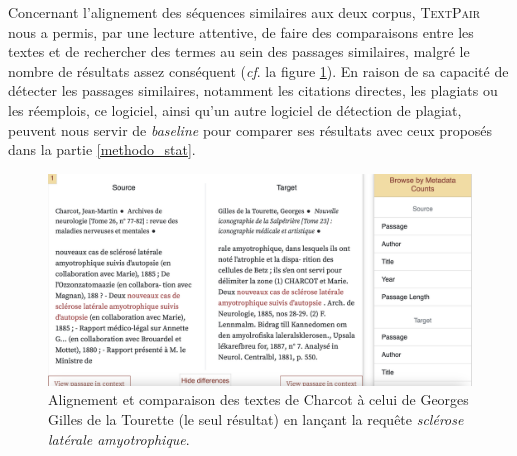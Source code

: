 Concernant l'alignement des séquences similaires aux deux corpus, \textsc{TextPair} nous a permis, par une lecture attentive, de faire des comparaisons entre les textes et de rechercher des termes au sein des passages similaires, malgré le nombre de résultats assez conséquent (\textit{cf}. la figure \ref{fig:textpair}). En raison de sa capacité de détecter les passages similaires, notamment les citations directes, les plagiats ou les réemplois, ce logiciel, ainsi qu'un autre logiciel de détection de plagiat, peuvent nous servir de \textit{baseline} pour comparer ses résultats avec ceux proposés dans la partie \ref{methodo_stat}.

\begin{figure}[!ht]
    \centering
    \includegraphics[width=1\textwidth]{img/textpair.png}
    \caption{Alignement et comparaison des textes de Charcot à celui de Georges Gilles de la Tourette (le seul résultat) en lançant la requête \textit{sclérose latérale amyotrophique}.}
    \label{fig:textpair}
\end{figure}
